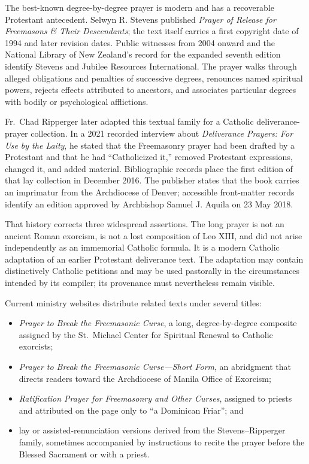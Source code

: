 The best-known degree-by-degree prayer is modern and has a recoverable Protestant antecedent.  Selwyn R. Stevens published \emph{Prayer of Release for Freemasons \& Their Descendants}; the text itself carries a first copyright date of 1994 and later revision dates.  Public witnesses from 2004 onward and the National Library of New Zealand's record for the expanded seventh edition identify Stevens and Jubilee Resources International.  The prayer walks through alleged obligations and penalties of successive degrees, renounces named spiritual powers, rejects effects attributed to ancestors, and associates particular degrees with bodily or psychological afflictions.

Fr.~Chad Ripperger later adapted this textual family for a Catholic deliverance-prayer collection.  In a 2021 recorded interview about \emph{Deliverance Prayers: For Use by the Laity}, he stated that the Freemasonry prayer had been drafted by a Protestant and that he had ``Catholicized it,'' removed Protestant expressions, changed it, and added material.  Bibliographic records place the first edition of that lay collection in December 2016.  The publisher states that the book carries an imprimatur from the Archdiocese of Denver; accessible front-matter records identify an edition approved by Archbishop Samuel J. Aquila on 23 May 2018.

That history corrects three widespread assertions.  The long prayer is not an ancient Roman exorcism, is not a lost composition of Leo XIII, and did not arise independently as an immemorial Catholic formula.  It is a modern Catholic adaptation of an earlier Protestant deliverance text.  The adaptation may contain distinctively Catholic petitions and may be used pastorally in the circumstances intended by its compiler; its provenance must nevertheless remain visible.

Current ministry websites distribute related texts under several titles:

\begin{itemize}
\item \emph{Prayer to Break the Freemasonic Curse}, a long, degree-by-degree composite assigned by the St.~Michael Center for Spiritual Renewal to Catholic exorcists;
\item \emph{Prayer to Break the Freemasonic Curse---Short Form}, an abridgment that directs readers toward the Archdiocese of Manila Office of Exorcism;
\item \emph{Ratification Prayer for Freemasonry and Other Curses}, assigned to priests and attributed on the page only to ``a Dominican Friar''; and
\item lay or assisted-renunciation versions derived from the Stevens--Ripperger family, sometimes accompanied by instructions to recite the prayer before the Blessed Sacrament or with a priest.
\end{itemize}

